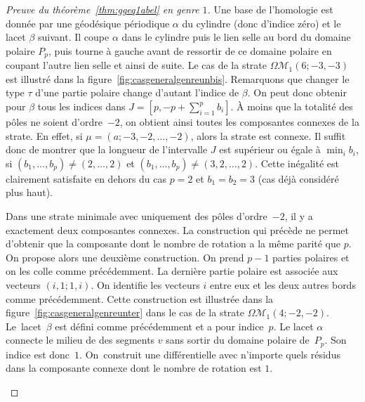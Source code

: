 \documentclass[11pt]{article}
\numberwithin{equation}{section}\renewcommand{\proofname}{Démonstration}
\let\mathcal\mathscr
\newcommand{\omoduli}[1][g]{{\Omega\mathcal M}_{\!#1}}
\theoremstyle{definition}
\begin{document}
\begin{proof}[Preuve du théorème~\ref{thm:ggeq1abel} en genre $1$]
Une base de l'homologie est donnée par une géodésique périodique $\alpha$ du cylindre (donc d'indice zéro) et le lacet $\beta$ suivant. Il coupe $\alpha$ dans le cylindre puis le lien selle au bord du domaine polaire $P_{p}$, puis tourne à gauche avant de ressortir de ce domaine polaire en coupant l'autre lien selle et ainsi de suite. Le cas de la strate $\omoduli[1](6;-3,-3)$ est illustré dans la figure~\ref{fig:casgeneralgenreunbis}.
Remarquons que changer le type $\tau$ d'une partie polaire change d'autant l'indice de $\beta$. On peut donc obtenir pour $\beta$ tous les indices dans $J=\left[ p,-p+\sum_{i=1}^{p} b_{i}\right]$. À moins que la totalité des pôles ne soient d'ordre~$-2$, on obtient ainsi toutes les composantes connexes de la strate. En effet, si $\mu=(a;-3,-2,\dots,-2)$, alors la strate est connexe. Il suffit donc de montrer que la longueur de l'intervalle $J$ est supérieur ou égale à $\min_{i} b_{i}$, si $(b_{1},\dots,b_{p})\neq (2,\dots,2)$ et $(b_{1},\dots,b_{p})\neq (3,2,\dots,2)$. Cette inégalité est clairement satisfaite en dehors du cas $p=2$ et $b_{1}=b_{2}=3$ (cas déjà considéré plus haut).

Dans une strate minimale avec uniquement des pôles d'ordre~$-2$, il y a exactement deux composantes connexes. La construction qui précède ne permet d'obtenir que la composante dont le nombre de rotation a la même parité que $p$.
On propose alors une deuxième construction. On prend $p-1$ parties polaires et on les colle comme précédemment. La dernière partie polaire est associée aux vecteurs $(i,1;1,i)$.
On identifie les vecteurs $i$ entre eux et les deux autres bords comme précédemment. Cette construction est illustrée dans la figure~\ref{fig:casgeneralgenreunter} dans le cas de la strate $\omoduli[1](4;-2,-2)$.
Le~lacet~$\beta$ est défini comme précédemment et a pour indice~$p$. Le lacet $\alpha$ connecte le milieu de des segments $v$ sans sortir du domaine polaire de~$P_{p}$. Son indice est donc~$1$. On~construit une différentielle avec n'importe quels résidus dans la composante connexe dont le nombre de rotation est $1$.

\begin{figure}[htb]
\center
{}
\end{figure}
\end{proof}
\end{document}
